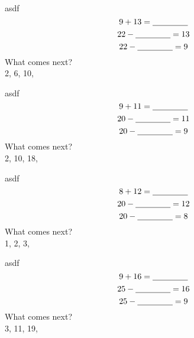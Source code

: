 \documentclass[letter, grid,frame,backs]{flashcards}
\begin{document}
\begin{flashcard}{asdf}
\Huge
\center
\vspace*{-0.8in}
    \[
9 + 13 = \underline{\hspace{1.5cm}} 
\]
\[
22 - \underline{\hspace{1.5cm}} = 13
\]
\[
22 - \underline{\hspace{1.5cm}} = 9
\]What comes next? \\
\vspace*{-0.3in}
2, 6, 10, \underline{\hspace{1.5cm}} \\

\end{flashcard}
\begin{flashcard}{asdf}
\Huge
\center
\vspace*{-0.8in}
    \[
9 + 11 = \underline{\hspace{1.5cm}} 
\]
\[
20 - \underline{\hspace{1.5cm}} = 11
\]
\[
20 - \underline{\hspace{1.5cm}} = 9
\]What comes next? \\
\vspace*{-0.3in}
2, 10, 18, \underline{\hspace{1.5cm}} \\

\end{flashcard}
\begin{flashcard}{asdf}
\Huge
\center
\vspace*{-0.8in}
    \[
8 + 12 = \underline{\hspace{1.5cm}} 
\]
\[
20 - \underline{\hspace{1.5cm}} = 12
\]
\[
20 - \underline{\hspace{1.5cm}} = 8
\]What comes next? \\
\vspace*{-0.3in}
1, 2, 3, \underline{\hspace{1.5cm}} \\

\end{flashcard}
\begin{flashcard}{asdf}
\Huge
\center
\vspace*{-0.8in}
    \[
9 + 16 = \underline{\hspace{1.5cm}} 
\]
\[
25 - \underline{\hspace{1.5cm}} = 16
\]
\[
25 - \underline{\hspace{1.5cm}} = 9
\]What comes next? \\
\vspace*{-0.3in}
3, 11, 19, \underline{\hspace{1.5cm}} \\

\end{flashcard}
\end{document}
